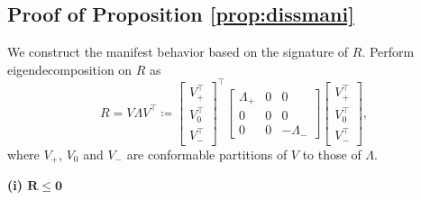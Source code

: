 \documentclass[11pt,print,draftcls,onecolumn,romanappendices]{ieeecolor}
\begin{document}
\subsection{Proof of Proposition \ref{prop:dissmani}}\label{appx:proofprop:dissmani}
We construct the manifest behavior based on the signature of $R$. Perform eigendecomposition on $R$ as
\begin{equation}\label{eq:EVD}
	R=V\Lambda V^\top\coloneqq\begin{bmatrix}
		V_+^\top \\ V_0^\top \\ V_-^\top 
	\end{bmatrix}^\top \begin{bmatrix}
		\Lambda_+&0&0\\ 0 & 0&0\\ 0& 0 & -\Lambda_-
	\end{bmatrix}\begin{bmatrix}
		V_+^\top \\ V_0^\top \\ V_-^\top 
	\end{bmatrix},
\end{equation} 
where $V_+$, $V_0$ and $V_-$ are conformable partitions of $V$ to those of $\Lambda$. 

\noindent \textbf{(i) $\boldsymbol{R\leq0}$}
\end{document}
